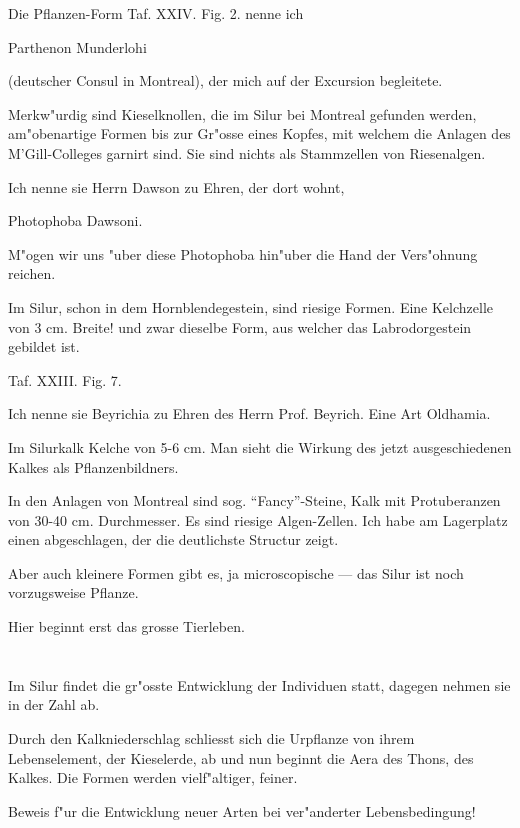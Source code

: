 \documentclass[a4paper, 11pt, oneside, german]{article}
\begin{document}
Die Pflanzen-Form Taf. XXIV. Fig. 2. nenne ich

Parthenon Munderlohi

(deutscher Consul in Montreal), der mich auf der Excursion begleitete.

Merkw"urdig sind Kieselknollen, die im Silur bei Montreal gefunden werden, am"obenartige Formen bis zur Gr"osse eines Kopfes, mit welchem die Anlagen des M'Gill-Colleges garnirt sind. Sie sind nichts als Stammzellen von Riesenalgen.

Ich nenne sie Herrn Dawson zu Ehren, der dort wohnt,

Photophoba Dawsoni.

M"ogen wir uns "uber diese Photophoba hin"uber die Hand der Vers"ohnung reichen.

Im Silur, schon in dem Hornblendegestein, sind riesige Formen. Eine Kelchzelle von 3 cm. Breite! und zwar dieselbe Form, aus welcher das Labrodorgestein gebildet ist.

Taf. XXIII. Fig. 7.

Ich nenne sie Beyrichia zu Ehren des Herrn Prof. Beyrich. Eine Art Oldhamia.

Im Silurkalk Kelche von 5-6 cm. Man sieht die Wirkung des jetzt ausgeschiedenen Kalkes als Pflanzenbildners.

In den Anlagen von Montreal sind sog. "`Fancy"'-Steine, Kalk mit Protuberanzen von 30-40 cm. Durchmesser. Es sind riesige Algen-Zellen. Ich habe am Lagerplatz einen abgeschlagen, der die deutlichste Structur zeigt.

Aber auch kleinere Formen gibt es, ja microscopische --- das Silur ist noch vorzugsweise Pflanze.

Hier beginnt erst das grosse Tierleben.
\clearpage
\section{}
\paragraph{}
Im Silur findet die gr"osste Entwicklung der Individuen statt, dagegen nehmen sie in der Zahl ab.

Durch den Kalkniederschlag schliesst sich die Urpflanze von ihrem Lebenselement, der Kieselerde, ab und nun beginnt die Aera des Thons, des Kalkes. Die Formen werden vielf"altiger, feiner.

Beweis f"ur die Entwicklung neuer Arten bei ver"anderter Lebensbedingung!
\end{document}
